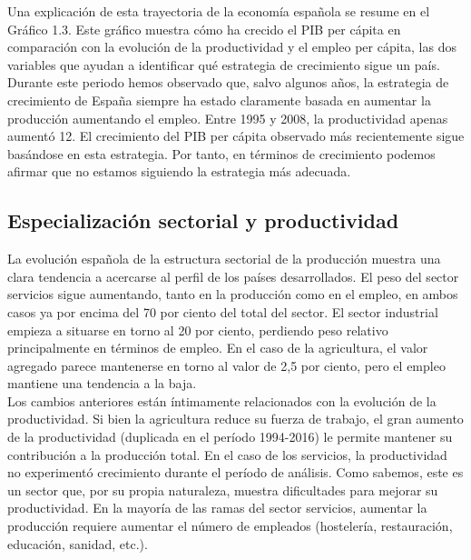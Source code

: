     Una explicación de esta trayectoria de la economía española se resume en el Gráfico 1.3. Este gráfico muestra cómo ha crecido el PIB per cápita en comparación con la evolución de la productividad y el empleo per cápita, las dos variables que ayudan a identificar qué estrategia de crecimiento sigue un país. Durante este periodo hemos observado que, salvo algunos años, la estrategia de crecimiento de España siempre ha estado claramente basada en aumentar la producción aumentando el empleo. Entre 1995 y 2008, la productividad apenas aumentó 12. El crecimiento del PIB per cápita observado más recientemente sigue basándose en esta estrategia. Por tanto, en términos de crecimiento podemos afirmar que no estamos siguiendo la estrategia más adecuada.\\

    \subsection{Especialización sectorial y productividad}
    La evolución española de la estructura sectorial de la producción muestra una clara tendencia a acercarse al perfil de los países desarrollados. El peso del sector servicios sigue aumentando, tanto en la producción como en el empleo, en ambos casos ya por encima del 70 por ciento del total del sector. El sector industrial empieza a situarse en torno al 20 por ciento, perdiendo peso relativo principalmente en términos de empleo. En el caso de la agricultura, el valor agregado parece mantenerse en torno al valor de 2,5 por ciento, pero el empleo mantiene una tendencia a la baja.\\
    Los cambios anteriores están íntimamente relacionados con la evolución de la productividad. Si bien la agricultura reduce su fuerza de trabajo, el gran aumento de la productividad (duplicada en el período 1994-2016) le permite mantener su contribución a la producción total. En el caso de los servicios, la productividad no experimentó crecimiento durante el período de análisis. Como sabemos, este es un sector que, por su propia naturaleza, muestra dificultades para mejorar su productividad. En la mayoría de las ramas del sector servicios, aumentar la producción requiere aumentar el número de empleados (hostelería, restauración, educación, sanidad, etc.).\\
